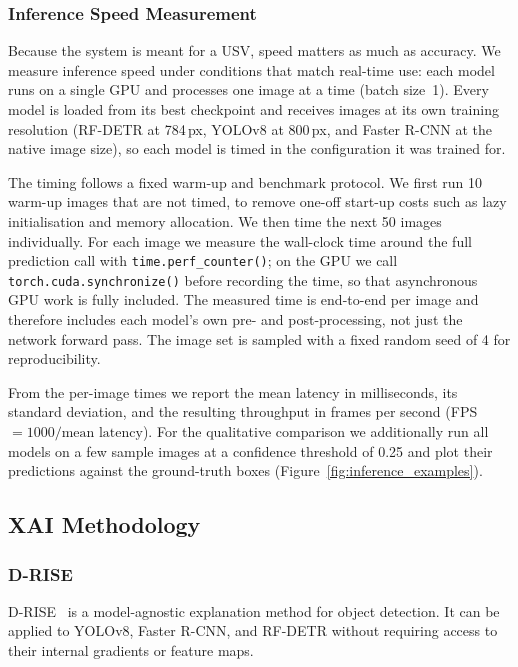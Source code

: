 \documentclass[11pt,a4paper]{article}
\begin{document}
\subsubsection{Inference Speed Measurement}
Because the system is meant for a USV, speed matters as much as accuracy. We
measure inference speed under conditions that match real-time use: each model
runs on a single GPU and processes one image at a time (batch size~1). Every
model is loaded from its best checkpoint and receives images at its own training
resolution (RF-DETR at 784\,px, YOLOv8 at 800\,px, and Faster R-CNN at the native
image size), so each model is timed in the configuration it was trained for.

The timing follows a fixed warm-up and benchmark protocol. We first run 10
warm-up images that are not timed, to remove one-off start-up costs such as lazy
initialisation and memory allocation. We then time the next 50 images
individually. For each image we measure the wall-clock time around the full
prediction call with \texttt{time.perf\_counter()}; on the GPU we call
\texttt{torch.cuda.synchronize()} before recording the time, so that asynchronous
GPU work is fully included. The measured time is end-to-end per image and
therefore includes each model's own pre- and post-processing, not just the
network forward pass. The image set is sampled with a fixed random seed of 4 for
reproducibility.

From the per-image times we report the mean latency in milliseconds, its
standard deviation, and the resulting throughput in frames per second
(FPS~$=1000/\text{mean latency}$). For the qualitative comparison we additionally
run all models on a few sample images at a confidence threshold of 0.25 and plot
their predictions against the ground-truth boxes
(Figure~\ref{fig:inference_examples}).

\subsection{XAI Methodology}

\subsubsection{D-RISE}

D-RISE~\cite{petsiuk2021drise} is a model-agnostic explanation method for object detection. It can be
applied to YOLOv8, Faster R-CNN, and RF-DETR without requiring access to their
internal gradients or feature maps.
\end{document}
